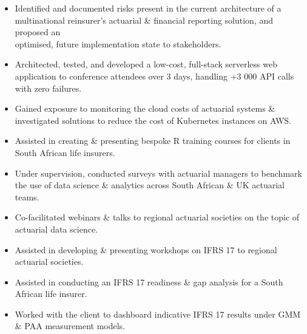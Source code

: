 \documentclass[10pt,a4paper,ragged2e,withhyper]{altacv}
\begin{document}
\begin{paracol}{2}
  \begin{itemize}[label=$\circ$, leftmargin=0.9cm, labelsep=0.43cm]
    \item Identified and documented risks present in the current architecture of a multinational reinsurer's actuarial \& financial reporting solution, and proposed an\\ optimised, future implementation state to stakeholders.
    \item Architected, tested, and developed a low-cost, full-stack serverless web \\application to conference attendees over 3 days, handling +3 000 API calls with zero failures.
    \item Gained exposure to monitoring the cloud costs of actuarial systems \& \\investigated solutions to reduce the cost of Kubernetes instances on AWS. 
  \end{itemize}

  \medskip 
  \smallskip
  \begin{itemize}[label=$\circ$, leftmargin=0.9cm, labelsep=0.43cm]
    \item Assisted in creating \& presenting bespoke R training courses for clients in South African life insurers.
    \item Under supervision, conducted surveys with actuarial managers to benchmark the use of data science \& analytics across South African \& UK actuarial teams. 
    \item Co-facilitated webinars \& talks to regional actuarial societies on the topic of actuarial data science. 
  \end{itemize}

  \begin{itemize}[label=$\circ$, leftmargin=0.9cm, labelsep=0.43cm]
    \item Assisted in developing \& presenting workshops on IFRS 17 to regional \\actuarial societies. 
    \item Assisted in conducting an IFRS 17 readiness \& gap analysis for a South African life insurer. 
    \item Worked with the client to dashboard indicative IFRS 17 results under GMM \& PAA measurement models. 
  \end{itemize}


\end{paracol}
\end{document}
